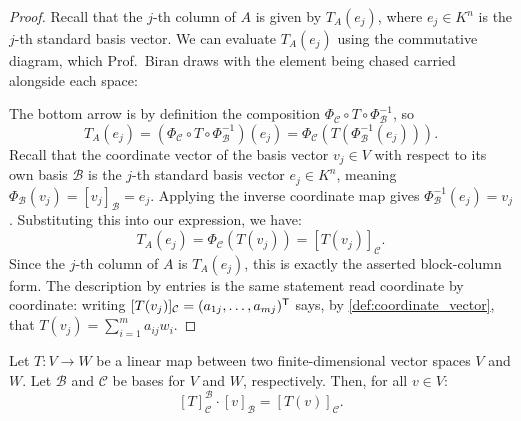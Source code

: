 \begin{proof}
Recall that the $j$-th column of $A$ is given by $T_A(e_j)$, where $e_j \in K^n$ is the $j$-th standard basis vector. We can evaluate $T_A(e_j)$ using the commutative diagram, which Prof.~Biran draws with the element being chased carried alongside each space:

\begin{center}
\end{center}

The bottom arrow is by definition the composition $\Phi_{\mathcal{C}} \circ T \circ \Phi_{\mathcal{B}}^{-1}$, so
\[
T_A(e_j) = \left( \Phi_{\mathcal{C}} \circ T \circ \Phi_{\mathcal{B}}^{-1} \right)(e_j) = \Phi_{\mathcal{C}}\left( T\left( \Phi_{\mathcal{B}}^{-1}(e_j) \right) \right).
\]
Recall that the coordinate vector of the basis vector $v_j \in V$ with respect to its own basis $\mathcal{B}$ is the $j$-th standard basis vector $e_j \in K^n$, meaning $\Phi_{\mathcal{B}}(v_j) = [v_j]_{\mathcal{B}} = e_j$. Applying the inverse coordinate map gives $\Phi_{\mathcal{B}}^{-1}(e_j) = v_j$. Substituting this into our expression, we have:
\[
T_A(e_j) = \Phi_{\mathcal{C}}(T(v_j)) = [T(v_j)]_{\mathcal{C}}.
\]
Since the $j$-th column of $A$ is $T_A(e_j)$, this is exactly the asserted block-column form. The description by entries is the same statement read coordinate by coordinate: writing $[T(v_j)]_{\mathcal{C}} = (a_{1j}, \dots, a_{mj})^{\mathsf{T}}$ says, by \cref{def:coordinate_vector}, that $T(v_j) = \sum_{i=1}^m a_{ij} w_i$.
\end{proof}

\begin{proposition}
\label{prop:matrix_evaluation}
Let $T: V \to W$ be a linear map between two finite-di\-men\-sional vector spaces $V$ and $W$. Let $\mathcal{B}$ and $\mathcal{C}$ be bases for $V$ and $W$, respectively. Then, for all $v \in V$:
\[
[T]_{\mathcal{C}}^{\mathcal{B}} \cdot [v]_{\mathcal{B}} = [T(v)]_{\mathcal{C}}.
\]
\end{proposition}

